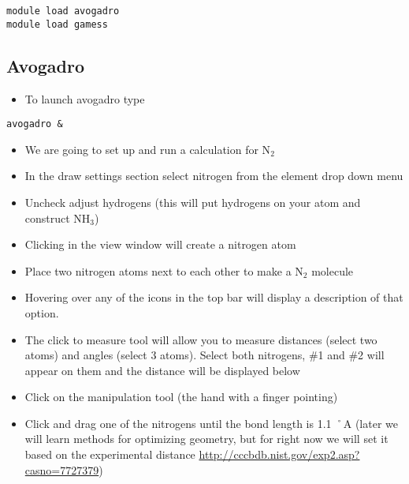 \documentclass[11pt]{article}
\begin{document}
\begin{verbatim}
module load avogadro
module load gamess
\end{verbatim}

\subsection{Avogadro}
\label{sec-1-3}

\begin{itemize}
\item To launch avogadro type
\end{itemize}

\begin{verbatim}
avogadro &
\end{verbatim}

\begin{itemize}
\item We are going to set up and run a calculation for N$_{\text{2}}$

\item In the draw settings section select nitrogen from the element drop down menu

\item Uncheck adjust hydrogens (this will put hydrogens on your atom and construct NH$_{\text{3}}$)

\item Clicking in the view window will create a nitrogen atom

\item Place two nitrogen atoms next to each other to make a N$_{\text{2}}$ molecule

\item Hovering over any of the icons in the top bar will display a description of that option.

\item The click to measure tool will allow you to measure distances (select two atoms) and angles (select 3 atoms). Select both nitrogens, \#1 and \#2 will appear on them and the distance will be displayed below

\item Click on the manipulation tool (the hand with a finger pointing)

\item Click and drag one of the nitrogens until the bond length is 1.1 ˚A (later we will learn methods for optimizing geometry, but for right now we will set it based on the experimental distance \url{http://cccbdb.nist.gov/exp2.asp?casno=7727379})
\end{itemize}
\end{document}
